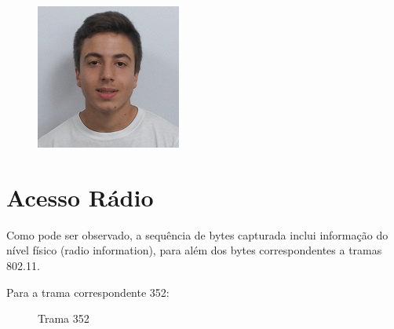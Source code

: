 \documentclass[11pt]{article}
\begin{document}
\begin{titlepage}
\begin{center}
\begin{figure}[hbt!]
            \centering
            \captionsetup{A89585}
        \endminipage\hfill
            \includegraphics[width=\linewidth]{images/capa/80.jpeg}
            \centering
            \captionsetup{A89597}
        \endminipage
        \end{figure}
    \end{center}
\end{titlepage}

\tableofcontents
\thispagestyle{empty}
\cleardoublepage

\setcounter{page}{1}


\section{Acesso Rádio}

Como pode ser observado, a sequência de bytes capturada inclui informação do nível físico (radio information), para além dos bytes correspondentes a tramas 802.11.

Para a trama correspondente 352:

\begin{figure}[hbt!]
    \centering
    \caption{Trama 352}
\end{figure}
\end{document}
